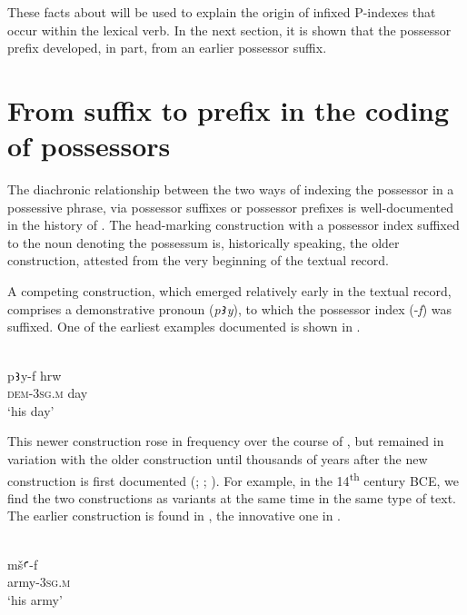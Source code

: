 \documentclass[output=paper]{LSP/langsci}
\begin{document}
These facts about  will be used to explain the origin of infixed P-indexes that occur within the lexical verb. In the next section, it is shown that the  possessor prefix developed, in part, from an earlier possessor suffix.


\section{From suffix to prefix in the coding of possessors}\label{05-sec:4}

The diachronic relationship between the two ways of indexing the possessor in a possessive phrase, \ie via possessor suffixes  or possessor prefixes  is well-documented in the history of . The head-marking construction with a possessor index suffixed to the noun denoting the possessum  is, historically speaking, the older construction, attested from the very beginning of the textual record.

 A competing construction, which emerged relatively early in the textual record, comprises a demonstrative pronoun (\textit{p\texttt{Ꜣ}y}), to which the possessor index (\eg -\textit{f}) was suffixed. One of the earliest examples documented is shown in .

\begin{exe}
\ex
\label{05-gr-ex:31}
\\
\gll p\texttt{Ꜣ}y-f hrw\\
\textsc{dem}-\textsc{3sg.m} day\\
\glt ‘his day’
\end{exe}

This newer construction rose in frequency over the course of  , but remained in variation with the older construction until thousands of years after the new construction is first documented (\citealt{GardinerSpread}; \citealt{SojicEmergence}; \citealt{WinandPronominal}). For example, in the 14\textsuperscript{th} century BCE, we find the two constructions as variants at the same time in the same type of text. The earlier construction is found in , the innovative one in .

\begin{exe}
\ex%
\label{05-gr-ex:32}
\\
\gll mš\texttt{Ꜥ}-f\\
 army-\textsc{3sg.m}\\
\glt ‘his army’
\end{exe}
\end{document}

